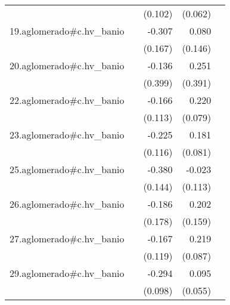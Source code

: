 {\begin{longtable}{l*{4}{D{.}{.}{-1}}}
            &                     &     (0.102)         &     (0.062)         &                     \\
\addlinespace
19.aglomerado#c.hv\_banio&                     &      -0.307         &       0.080         &                     \\
            &                     &     (0.167)         &     (0.146)         &                     \\
\addlinespace
20.aglomerado#c.hv\_banio&                     &      -0.136         &       0.251         &                     \\
            &                     &     (0.399)         &     (0.391)         &                     \\
\addlinespace
22.aglomerado#c.hv\_banio&                     &      -0.166         &       0.220\sym{**} &                     \\
            &                     &     (0.113)         &     (0.079)         &                     \\
\addlinespace
23.aglomerado#c.hv\_banio&                     &      -0.225         &       0.181\sym{*}  &                     \\
            &                     &     (0.116)         &     (0.081)         &                     \\
\addlinespace
25.aglomerado#c.hv\_banio&                     &      -0.380\sym{**} &      -0.023         &                     \\
            &                     &     (0.144)         &     (0.113)         &                     \\
\addlinespace
26.aglomerado#c.hv\_banio&                     &      -0.186         &       0.202         &                     \\
            &                     &     (0.178)         &     (0.159)         &                     \\
\addlinespace
27.aglomerado#c.hv\_banio&                     &      -0.167         &       0.219\sym{*}  &                     \\
            &                     &     (0.119)         &     (0.087)         &                     \\
\addlinespace
29.aglomerado#c.hv\_banio&                     &      -0.294\sym{**} &       0.095         &                     \\
            &                     &     (0.098)         &     (0.055)         &                     \\

\end{longtable}}
